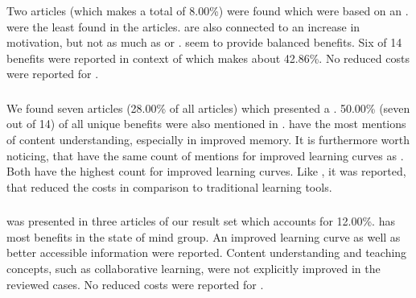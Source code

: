 \subsubsection{\ARBns}
Two articles (which makes a total of 8.00\%) were found which were based on an \ARB \appns. \ARB \apps were the least found in the articles. \ARB \apps are also connected to an increase in motivation, but not as much as \DBL or \OMns. \ARB seem to provide balanced benefits. Six of 14 benefits were reported in context of \ARB which makes about 42.86\%. No reduced costs were reported for \ARB \apps.

\subsubsection{\STns}
We found seven articles (28.00\% of all articles) which presented a \ST \AR \appns. 50.00\% (seven out of 14) of all unique benefits were also mentioned in \ST \appsns. \ST \apps have the most mentions of content understanding, especially in improved memory. It is furthermore worth noticing, that \ST \apps have the same count of mentions for improved learning curves as \DBL \appsns. Both have the highest count for improved learning curves. Like \OM \appsns, it was reported, that \ST \apps reduced the costs in comparison to traditional learning tools.

\subsubsection{\ARGns}
\ARG was presented in three articles of our result set which accounts for 12.00\%. \ARG has most benefits in the state of mind group. An improved learning curve as well as better accessible information were reported. Content understanding and teaching concepts, such as collaborative learning, were not explicitly improved in the reviewed cases. No reduced costs were reported for \ARG \appsns.

